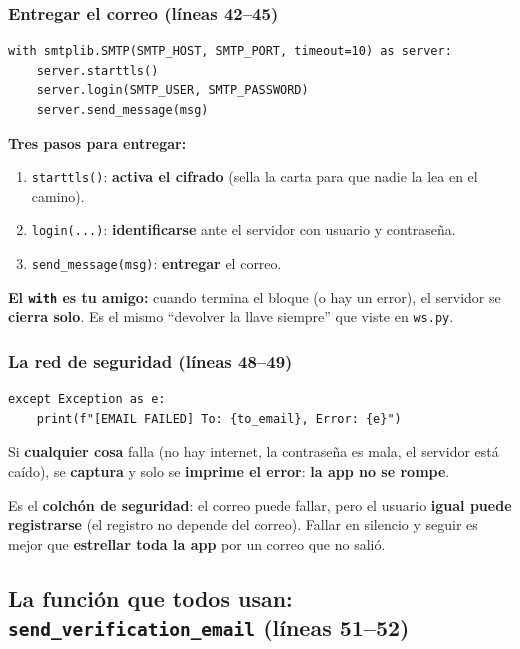\documentclass[11pt,a4paper]{article}
\begin{document}
\subsubsection{Entregar el correo (líneas 42--45)}

\begin{lstlisting}
with smtplib.SMTP(SMTP_HOST, SMTP_PORT, timeout=10) as server:
    server.starttls()
    server.login(SMTP_USER, SMTP_PASSWORD)
    server.send_message(msg)
\end{lstlisting}

\textbf{Tres pasos para entregar:}
\begin{enumerate}
    \item \texttt{starttls()}: \textbf{activa el cifrado} (sella la carta para que nadie la
    lea en el camino).
    \item \texttt{login(...)}: \textbf{identificarse} ante el servidor con usuario y contraseña.
    \item \texttt{send\_message(msg)}: \textbf{entregar} el correo.
\end{enumerate}

\textbf{El \texttt{with} es tu amigo:} cuando termina el bloque (o hay un error), el servidor
se \textbf{cierra solo}. Es el mismo ``devolver la llave siempre'' que viste en \texttt{ws.py}.

\subsubsection{La red de seguridad (líneas 48--49)}

\begin{lstlisting}
except Exception as e:
    print(f"[EMAIL FAILED] To: {to_email}, Error: {e}")
\end{lstlisting}

Si \textbf{cualquier cosa} falla (no hay internet, la contraseña es mala, el servidor está
caído), se \textbf{captura} y solo se \textbf{imprime el error}: \textbf{la app no se rompe}.

\begin{analogia}
Es el \textbf{colchón de seguridad}: el correo puede fallar, pero el usuario \textbf{igual
puede registrarse} (el registro no depende del correo). Fallar en silencio y seguir es mejor
que \textbf{estrellar toda la app} por un correo que no salió.
\end{analogia}

\subsection{La función que todos usan: \texttt{send\_verification\_email} (líneas 51--52)}
\end{document}
